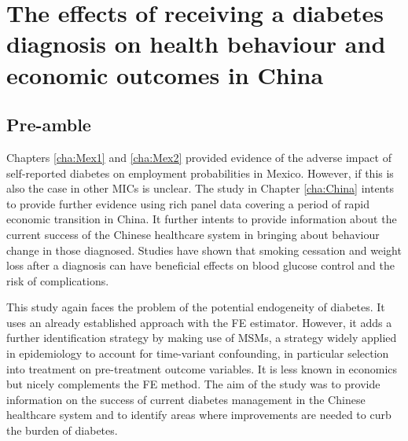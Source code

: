 {
\acresetall  %
\chapter{\label{cha:China}The effects of receiving a diabetes diagnosis on health behaviour and economic outcomes in China}
\section*{Pre-amble}

Chapters \ref{cha:Mex1} and \ref{cha:Mex2} provided evidence of the adverse impact of self-reported diabetes on employment probabilities in Mexico. However, if this is also the case in other \acp{MIC} is unclear. The study in Chapter \ref{cha:China} intents to provide further evidence using rich panel data covering a period of rapid economic transition in China. It further intents to provide information about the current success of the Chinese healthcare system in bringing about behaviour change in those diagnosed. Studies have shown that smoking cessation and weight loss after a diagnosis can have beneficial effects on blood glucose control and the risk of complications.

This study again faces the problem of the potential endogeneity of diabetes. It uses an already established approach with the \ac{FE} estimator. However, it adds a further identification strategy by making use of \acp{MSM}, a strategy widely applied in epidemiology to account for time-variant confounding, in particular selection into treatment on pre-treatment outcome variables. It is less known in economics but nicely complements the \ac{FE} method. The aim of the study was to provide information on the success of current diabetes management in the Chinese healthcare system and to identify areas where improvements are needed to curb the burden of diabetes.
}

\printbibliography

          
